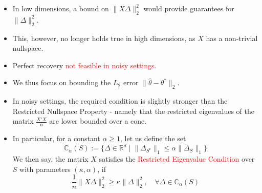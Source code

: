 \documentclass[10pt,handout,english]{beamer}
\newcommand{\R}{\mathbb{R}}
\newcommand{\C}{\mathbb{C}}
\begin{document}
\begin{frame}[allowframebreaks]
\begin{itemize}
\item In low dimensions, a bound on $\lVert X\Delta\rVert_2^2$ would provide guarantees for $\lVert\Delta\rVert_2^2$.\justifying
\item This, however, no longer holds true in high dimensions, as $X$ has a non-trivial nullspace.\justifying
\item Perfect recovery \textcolor{red}{not feasible in noisy settings}.\justifying
\item We thus focus on bounding the $L_2$ error $\lVert \hat{\theta}-\theta^*\rVert_2$. \justifying
\item In noisy settings, the required condition is slightly stronger than the Restricted Nullspace Property - namely that the restricted eigenvalues of the matrix $\frac{X'X}{n}$ are lower bounded over a cone.\justifying
\item In particular, for a constant $\alpha\geq 1$, let us define the set
\[
\C_{\alpha}(S):=\{\Delta\in\R^d\mid\lVert\Delta_{S^c}\rVert_1\leq\alpha\lVert\Delta_S\rVert_1\}
\]
We then say, the matrix $X$ satisfies the \textcolor{red}{Restricted Eigenvalue Condition} over $S$ with parameters $(\kappa,\alpha)$, if
\[
\frac{1}{n}\lVert X\Delta \rVert_2^2\geq \kappa\lVert \Delta\rVert_2^2,\quad\forall\Delta\in\C_{\alpha}(S)
\]
\end{itemize}
\end{frame}
\end{document}
